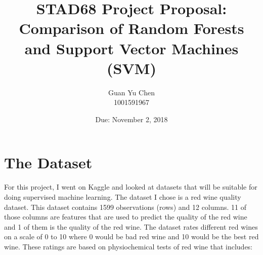 \documentclass[13pt,a4paper,titlepage]{article}
\title{STAD68 Project Proposal: Comparison of Random Forests and Support Vector Machines (SVM)}
\author{Guan Yu Chen\\ 1001591967}
\date{Due: November 2, 2018}
\begin{document}
	\maketitle
	\section*{The Dataset}
	For this project, I went on Kaggle and looked at datasets that will be suitable for doing supervised machine learning. The dataset I chose is a red wine quality dataset. This dataset contains 1599 observations (rows) and 12 columns. 11 of those columns are features that are used to predict the quality of the red wine and 1 of them is the quality of the red wine. The dataset rates different red wines on a scale of 0 to 10 where 0 would be bad red wine and 10 would be the best red wine. These ratings are based on physiochemical tests of red wine that includes:
\end{document}
